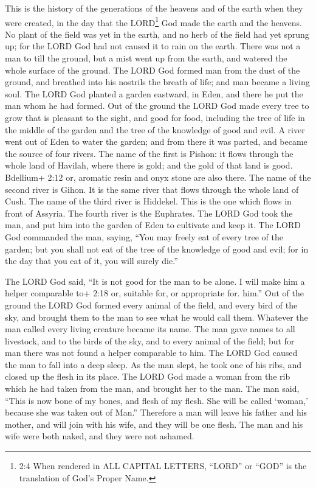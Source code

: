  This is the history of the generations of the heavens and
of the earth when they were created, in the day that the LORD\footnote{2:4
  When rendered in ALL CAPITAL LETTERS, ``LORD'' or ``GOD'' is the
  translation of God's Proper Name.} God made the earth and the heavens.
 No plant of the field was yet in the earth, and no herb of
the field had yet sprung up; for the LORD God had not caused it to rain
on the earth. There was not a man to till the ground,  but a
mist went up from the earth, and watered the whole surface of the
ground.  The LORD God formed man from the dust of the
ground, and breathed into his nostrils the breath of life; and man
became a living soul.  The LORD God planted a garden
eastward, in Eden, and there he put the man whom he had formed.
 Out of the ground the LORD God made every tree to grow that
is pleasant to the sight, and good for food, including the tree of life
in the middle of the garden and the tree of the knowledge of good and
evil.  A river went out of Eden to water the garden; and
from there it was parted, and became the source of four rivers.
 The name of the first is Pishon: it flows through the
whole land of Havilah, where there is gold;  and the gold
of that land is good. Bdellium+ 2:12 or, aromatic resin and onyx stone
are also there.  The name of the second river is Gihon. It
is the same river that flows through the whole land of Cush.
 The name of the third river is Hiddekel. This is the one
which flows in front of Assyria. The fourth river is the Euphrates.
 The LORD God took the man, and put him into the garden of
Eden to cultivate and keep it.  The LORD God commanded the
man, saying, ``You may freely eat of every tree of the garden;
 but you shall not eat of the tree of the knowledge of good
and evil; for in the day that you eat of it, you will surely die.''

 The LORD God said, ``It is not good for the man to be
alone. I will make him a helper comparable to+ 2:18 or, suitable for, or
appropriate for. him.''  Out of the ground the LORD God
formed every animal of the field, and every bird of the sky, and brought
them to the man to see what he would call them. Whatever the man called
every living creature became its name.  The man gave names
to all livestock, and to the birds of the sky, and to every animal of
the field; but for man there was not found a helper comparable to him.
 The LORD God caused the man to fall into a deep sleep. As
the man slept, he took one of his ribs, and closed up the flesh in its
place.  The LORD God made a woman from the rib which he had
taken from the man, and brought her to the man.  The man
said, ``This is now bone of my bones, and flesh of my flesh. She will be
called `woman,' because she was taken out of Man.'' 
Therefore a man will leave his father and his mother, and will join with
his wife, and they will be one flesh.  The man and his wife
were both naked, and they were not ashamed.

